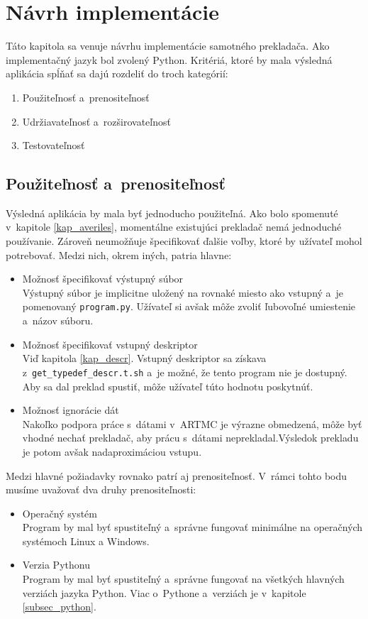\chapter{Návrh implementácie}
\label{kap_imp}
Táto kapitola sa venuje návrhu implementácie samotného prekladača.
Ako implementačný jazyk bol zvolený Python. Kritériá, ktoré by mala výsledná
aplikácia spĺňať sa dajú rozdeliť do troch kategórií:
\begin{enumerate}
    \item Použiteľnosť a~prenositeľnosť
    \item Udržiavateľnosť a~rozširovateľnosť
    \item Testovateľnosť
\end{enumerate}

\section{Použiteľnosť a~prenositeľnosť}
Výsledná aplikácia by mala byť jednoducho použiteľná. Ako bolo spomenuté
v~kapitole \ref{kap_averiles}, momentálne existujúci prekladač nemá jednoduché používanie. Zároveň
neumožňuje špecifikovať ďalšie voľby, ktoré by užívateľ mohol potrebovať. Medzi nich, okrem iných, patria hlavne:
\begin{itemize}
    \item Možnosť špecifikovať výstupný súbor\\
        Výstupný súbor je implicitne uložený na rovnaké miesto ako vstupný a~je
        pomenovaný \texttt{program.py}. Užívateľ si avšak môže zvoliť ľubovoľné umiestenie
        a~názov súboru.
    \item Možnosť špecifikovať vstupný deskriptor\\
        Viď kapitola \ref{kap_descr}. Vstupný deskriptor sa získava z~\texttt{get\_typedef\_descr.t.sh} a~je
        možné, že tento program nie je dostupný. Aby sa dal preklad spustiť, môže
        užívateľ túto hodnotu poskytnúť.
    \item Možnosť ignorácie dát\\
        Nakoľko podpora práce s~dátami v~ARTMC je výrazne obmedzená, môže byť
        vhodné nechať prekladač, aby prácu s~dátami neprekladal.Výsledok prekladu je potom avšak	  nadaproximáciou vstupu.
\end{itemize}

Medzi hlavné požiadavky rovnako patrí aj prenositeľnosť. V~rámci tohto bodu
musíme uvažovať dva druhy prenositeľnosti:
\begin{itemize}
    \item Operačný systém\\
        Program by mal byť spustiteľný a~správne fungovať minimálne na operačných systémoch Linux a Windows.
    \item Verzia Pythonu\\
        Program by mal byť spustiteľný a~správne fungovať na všetkých hlavných verziách jazyka Python.
        Viac o~Pythone a~verziách je v~kapitole \ref{subsec_python}.
\end{itemize}

